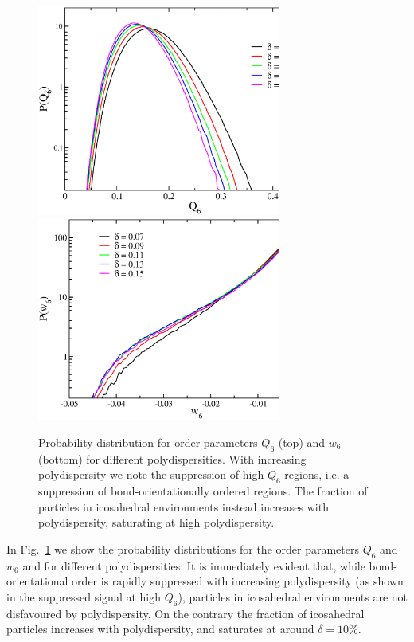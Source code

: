 \documentclass[twocolumn,superscriptaddress]{revtex4-1}
\begin{document}
\begin{figure}
 \centering
 \includegraphics[width=8cm]{./figures/Q6_prob.eps}
 \includegraphics[width=8cm]{./figures/w6_prob.eps}
 \caption{Probability distribution for order parameters $Q_6$ (top) and $w_6$ (bottom) for
different polydispersities. With increasing polydispersity we note the suppression
of high $Q_6$ regions, i.e. a suppression of bond-orientationally ordered regions. The fraction of
particles in icosahedral environments instead increases with polydispersity, saturating at
high polydispersity.}
 \label{fig:polydispersity}
\end{figure}


In Fig.~\ref{fig:polydispersity} we show the probability distributions for the order
parameters $Q_6$ and $w_6$ and for different polydispersities. It is immediately
evident that, while bond-orientational order is rapidly suppressed with increasing
polydispersity (as shown in the suppressed signal at high $Q_6$), particles in icosahedral
environments are not disfavoured by polydispersity. On the contrary the fraction of
icosahedral particles increases with polydispersity, and saturates at around $\delta=10\%$.
\end{document}
